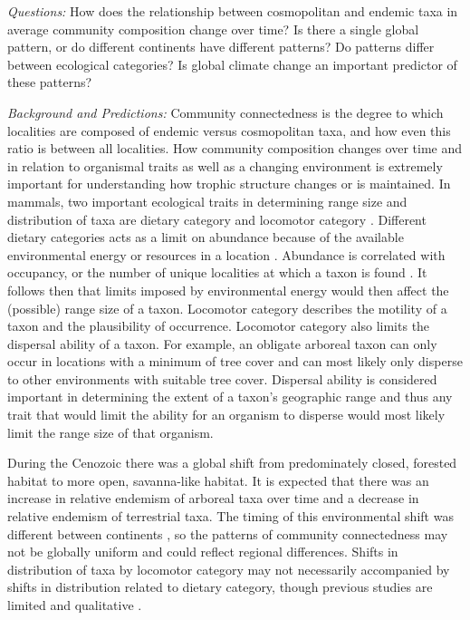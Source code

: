 \documentclass[12pt,letterpaper]{article}
\begin{document}
\textit{Questions:} 
How does the relationship between cosmopolitan and endemic taxa in average community composition change over time? Is there a single global pattern, or do different continents have different patterns? Do patterns differ between ecological categories? Is global climate change an important predictor of these patterns?

\textit{Background and Predictions:}
Community connectedness is the degree to which localities are composed of endemic versus cosmopolitan taxa, and how even this ratio is between all localities. How community composition changes over time and in relation to organismal traits as well as a changing environment is extremely important for understanding how trophic structure changes or is maintained. In mammals, two important ecological traits in determining range size and distribution of taxa are dietary category and locomotor category \citep{Jernvall2004,Lyons2005,Lyons2010}. Different dietary categories acts as a limit on abundance because of the available environmental energy or resources in a location \citep{VanValen1989,Brown1987,Damuth1979,Silva1997,Janis2000}. Abundance is correlated with occupancy, or the number of unique localities at which a taxon is found \citep{Jernvall2002,Fortelius2002,Brown1984}. It follows then that limits imposed by environmental energy would then affect the (possible) range size of a taxon. Locomotor category describes the motility of a taxon and the plausibility of occurrence. Locomotor category also limits the dispersal ability of a taxon. For example, an obligate arboreal taxon can only occur in locations with a minimum of tree cover and can most likely only disperse to other environments with suitable tree cover. Dispersal ability is considered important in determining the extent of a taxon's geographic range \citep{Birand2012,Jablonski2006a,Gaston2009} and thus any trait that would limit the ability for an organism to disperse would most likely limit the range size of that organism.

During the Cenozoic there was a global shift from predominately closed, forested habitat to more open, savanna-like habitat. It is expected that there was an increase in relative endemism of arboreal taxa over time and a decrease in relative endemism of terrestrial taxa. The timing of this environmental shift was different between continents \citep{Stromberg2005,Stromberg2013}, so the patterns of community connectedness may not be globally uniform and could reflect regional differences. Shifts in distribution of taxa by locomotor category may not necessarily accompanied by shifts in distribution related to dietary category, though previous studies are limited and qualitative \citep{Janis1993a}. 
\end{document}
